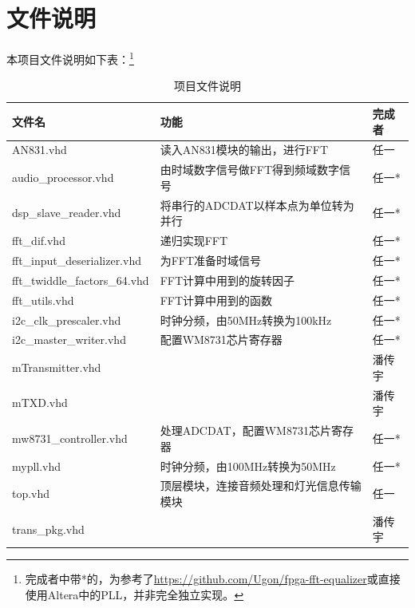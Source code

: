 \documentclass[12pt]{article}
\begin{document}
\section{文件说明}
本项目文件说明如下表：\footnote{完成者中带*的，为参考了\url{https://github.com/Ugon/fpga-fft-equalizer}或直接使用Altera中的PLL，并非完全独立实现。}
\begin{table}[h]
    \begin{tabular}{|l|l|l|}
    \hline
    文件名                           & 功能                                       & 完成者 \\ \hline
    AN831.vhd                     & 读入AN831模块的输出，进行FFT                & 任一  \\ \hline
    audio\_processor.vhd          & 由时域数字信号做FFT得到频域数字信号                      & 任一*  \\ \hline
    dsp\_slave\_reader.vhd        & 将串行的ADCDAT以样本点为单位转为并行                    & 任一*  \\ \hline
    fft\_dif.vhd                  & 递归实现FFT                                  & 任一*  \\ \hline
    fft\_input\_deserializer.vhd  & 为FFT准备时域信号                               & 任一*  \\ \hline
    fft\_twiddle\_factors\_64.vhd & FFT计算中用到的旋转因子                            & 任一*  \\ \hline
    fft\_utils.vhd                & FFT计算中用到的函数                              & 任一*  \\ \hline
    i2c\_clk\_prescaler.vhd       & 时钟分频，由50MHz转换为100kHz                     & 任一* \\ \hline
    i2c\_master\_writer.vhd       & 配置WM8731芯片寄存器                            & 任一*  \\ \hline
    mTransmitter.vhd              &                                          & 潘传宇 \\ \hline
    mTXD.vhd                      &                                          & 潘传宇 \\ \hline
    mw8731\_controller.vhd        & 处理ADCDAT，配置WM8731芯片寄存器                & 任一*  \\ \hline
    mypll.vhd                     & 时钟分频，由100MHz转换为50MHz                     & 任一*  \\ \hline
    top.vhd                       & 顶层模块，连接音频处理和灯光信息传输模块 & 任一  \\ \hline
    trans\_pkg.vhd                &                                          & 潘传宇 \\ \hline
    \end{tabular}
    \caption{项目文件说明}
    \end{table}
\end{document}
